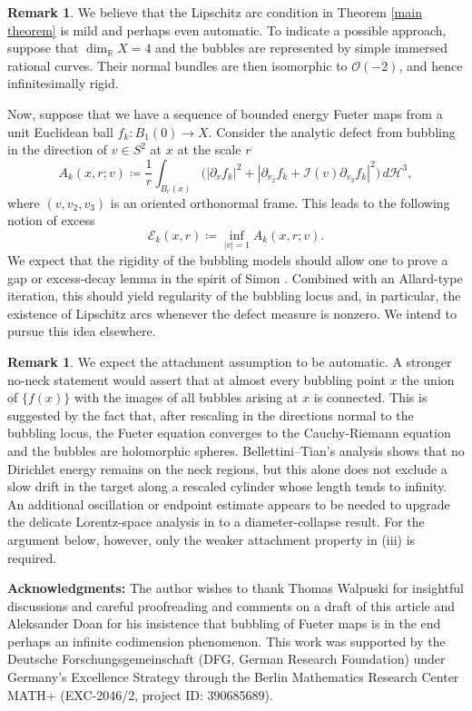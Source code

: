 \documentclass[11pt,a4paper]{article}
\theoremstyle{definition}
\newtheorem{rem}[theorem]{Remark}
\newcommand{\cE}{\mathcal{E}}
\newcommand{\cH}{\mathcal{H}}
\newcommand{\cI}{\mathcal{I}}
\newcommand{\cO}{\mathcal{O}}
\newcommand{\bR}{\mathbb{R}}
\begin{document}
\begin{rem}
  We believe that the Lipschitz arc condition in Theorem \ref{main theorem} is mild and perhaps even automatic. To indicate a possible approach, suppose that $\dim_{\bR} X = 4$ and the bubbles are represented by simple immersed rational curves. Their normal bundles are then isomorphic to $\cO(-2)$, and hence infinitesimally rigid. 

  Now, suppose that we have a sequence of bounded energy Fueter maps from a unit Euclidean ball $f_k : B_1(0) \to X$. Consider the analytic defect from bubbling in the direction of $v\in S^2$ at $x$ at the scale $r$
  \begin{equation*}
    A_k(x,r;v) \coloneq \frac{1}{r}\int_{B_r(x)}
    \big(|\partial_v f_k|^2 + |\partial_{v_2}f_k + \cI(v)\partial_{v_3}f_k|^2 \big)\, d\cH^3,
  \end{equation*}
  where $(v, v_2, v_3)$ is an oriented orthonormal frame. This leads to the following notion of excess
  \begin{equation*}
    \cE_k(x, r) \coloneq \inf_{|v|=1} A_k(x, r; v).
  \end{equation*}
  We expect that the rigidity of the bubbling models should allow one to prove a gap or excess-decay lemma in the spirit of Simon \cite[Lemma 1 of Section 1]{Si93}. Combined with an Allard-type iteration, this should yield regularity of the bubbling locus and, in particular, the existence of Lipschitz arcs whenever the defect measure is nonzero. We intend to pursue this idea elsewhere.
\end{rem}

\begin{rem}
  We expect the attachment assumption to be automatic. A stronger no-neck statement would assert that at almost every bubbling point $x$ the union of $\{f(x)\}$ with the images of all bubbles arising at $x$ is connected. This is suggested by the fact that, after rescaling in the directions normal to the bubbling locus, the Fueter equation converges to the Cauchy-Riemann equation and the bubbles are holomorphic spheres. Bellettini--Tian's analysis shows that no Dirichlet energy remains on the neck regions, but this alone does not exclude a slow drift in the target along a rescaled cylinder whose length tends to infinity. An additional oscillation or endpoint estimate appears to be needed to upgrade the delicate Lorentz-space analysis in \cite[Section 5]{BT19} to a diameter-collapse result. For the argument below, however, only the weaker attachment property in (iii) is required.
\end{rem}
\textbf{Acknowledgments:} The author wishes to thank Thomas Walpuski for insightful discussions and careful proofreading and comments on a draft of this article and Aleksander Doan for his insistence that bubbling of Fueter maps is in the end perhaps an infinite codimension phenomenon. This work was supported by the Deutsche Forschungsgemeinschaft (DFG, German Research Foundation) under Germany's Excellence Strategy through the Berlin Mathematics Research Center MATH+ (EXC-2046/2, project ID: 390685689). 
\end{document}
